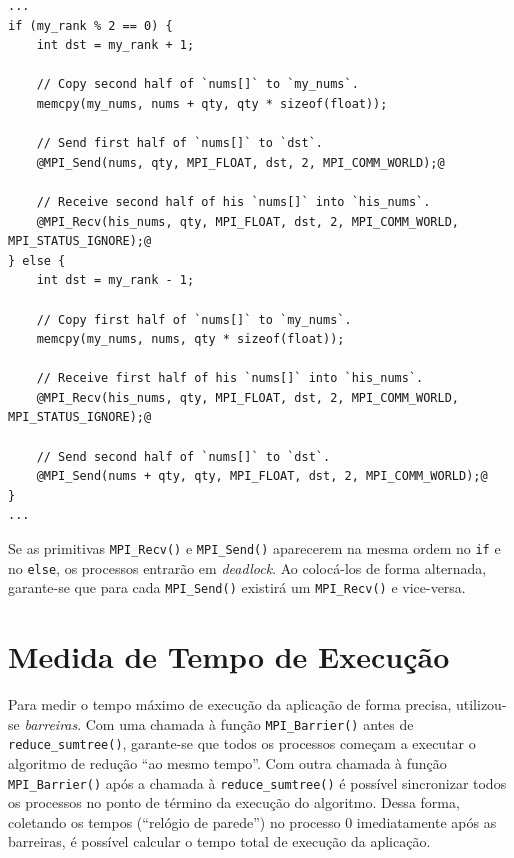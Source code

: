 \documentclass[12pt,a4paper]{article}
\begin{document}
\begin{minipage}{\linewidth}
\begin{lstlisting}[frame=single, style=c, label={code:deadlock},
    caption={Ordem das primitivas MPI\_Send() e MPI\_Recv() na função \texttt{reduce\_sumtree()}.}]
...
if (my_rank % 2 == 0) {
    int dst = my_rank + 1;

    // Copy second half of `nums[]` to `my_nums`.
    memcpy(my_nums, nums + qty, qty * sizeof(float));

    // Send first half of `nums[]` to `dst`.
    @MPI_Send(nums, qty, MPI_FLOAT, dst, 2, MPI_COMM_WORLD);@

    // Receive second half of his `nums[]` into `his_nums`.
    @MPI_Recv(his_nums, qty, MPI_FLOAT, dst, 2, MPI_COMM_WORLD, MPI_STATUS_IGNORE);@
} else {
    int dst = my_rank - 1;

    // Copy first half of `nums[]` to `my_nums`.
    memcpy(my_nums, nums, qty * sizeof(float));

    // Receive first half of his `nums[]` into `his_nums`.
    @MPI_Recv(his_nums, qty, MPI_FLOAT, dst, 2, MPI_COMM_WORLD, MPI_STATUS_IGNORE);@

    // Send second half of `nums[]` to `dst`.
    @MPI_Send(nums + qty, qty, MPI_FLOAT, dst, 2, MPI_COMM_WORLD);@
}
...
\end{lstlisting}
\end{minipage}

Se as primitivas \texttt{MPI\_Recv()} e \texttt{MPI\_Send()} aparecerem na mesma
ordem no \texttt{if} e no \texttt{else}, os processos entrarão em
\textit{deadlock}. Ao colocá-los de forma alternada, garante-se que para cada
\texttt{MPI\_Send()} existirá um \texttt{MPI\_Recv()} e vice-versa.

\section{Medida de Tempo de Execução}
Para medir o tempo máximo de execução da aplicação de forma precisa, utilizou-se
\emph{barreiras}. Com uma chamada à função \texttt{MPI\_Barrier()} antes de
\texttt{reduce\_sumtree()}, garante-se que todos os processos começam a executar
o algoritmo de redução ``ao mesmo tempo''. Com outra chamada à função
\texttt{MPI\_Barrier()} após a chamada à \texttt{reduce\_sumtree()} é possível
sincronizar todos os processos no ponto de término da execução do algoritmo.
Dessa forma, coletando os tempos (``relógio de parede'') no processo 0
imediatamente após as barreiras, é possível calcular o tempo total de execução
da aplicação.
\end{document}
